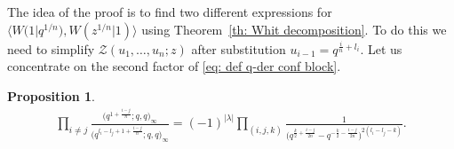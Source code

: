 \documentclass[pdftex]{sigma}
\numberwithin{equation}{section}
\newtheorem{Proposition}[Theorem]{Proposition}
\theoremstyle{definition}
\begin{document}
The idea of the proof is to find two different expressions for $\big\langle W\big(1| q^{1/n} \big) , W(z^{1/n}|1)\big\rangle$ using Theorem~\ref{th: Whit decomposition}. To do this we need to simplify $\mathcal{Z} (u_1, \dots, u_n ; z)$ after substitution $u_{i-1} = q^{\frac{i}{n}+l_i}$. Let us concentrate on the second factor of \eqref{eq: def q-der conf block}.
\begin{Proposition} \label{prop: Z 1-loop}
\begin{gather*}
\prod_{i \neq j} \frac{\big( q^{1+\frac{i-j}{n}} ;q,q \big)_{\infty}}{ \big(q^{l_i - l_j+1+\frac{i-j}{n}};q,q \big)_{\infty}} = (-1)^{| \lambda |} \prod_{(i,j,k)} \frac{1}{\big(q^{\frac{k}{2}+\frac{i-j}{2n}} -q^{-\frac{k}{2}-\frac{i-j}{2n}} \big)^{2(l_i-l_j-k)}}.
\end{gather*}
\end{Proposition}
\end{document}
